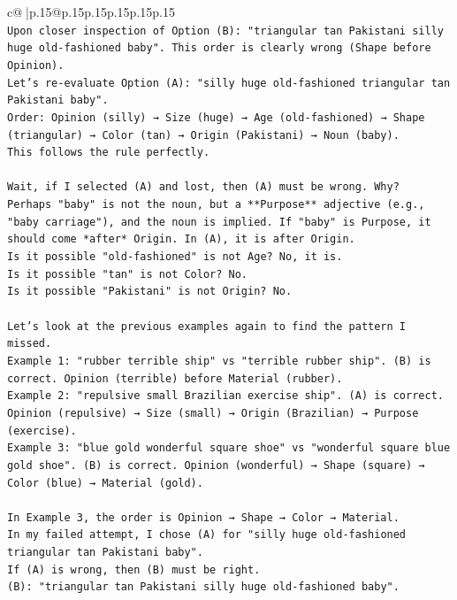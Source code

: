 \documentclass{article}
\begin{document}
{\begin{supertabular}{c@{$\;$}|p{.15\linewidth}@{}p{.15\linewidth}p{.15\linewidth}p{.15\linewidth}p{.15\linewidth}p{.15\linewidth}}
{{{\\ 
\texttt{Upon closer inspection of Option (B): "triangular tan Pakistani silly huge old{-}fashioned baby". This order is clearly wrong (Shape before Opinion).} \\
\texttt{Let's re{-}evaluate Option (A): "silly huge old{-}fashioned triangular tan Pakistani baby".} \\
\texttt{Order: Opinion (silly) → Size (huge) → Age (old{-}fashioned) → Shape (triangular) → Color (tan) → Origin (Pakistani) → Noun (baby).} \\
\texttt{This follows the rule perfectly.} \\
\\ 
\texttt{Wait, if I selected (A) and lost, then (A) must be wrong. Why?} \\
\texttt{Perhaps "baby" is not the noun, but a **Purpose** adjective (e.g., "baby carriage"), and the noun is implied. If "baby" is Purpose, it should come *after* Origin. In (A), it is after Origin.} \\
\texttt{Is it possible "old{-}fashioned" is not Age? No, it is.} \\
\texttt{Is it possible "tan" is not Color? No.} \\
\texttt{Is it possible "Pakistani" is not Origin? No.} \\
\\ 
\texttt{Let's look at the previous examples again to find the pattern I missed.} \\
\texttt{Example 1: "rubber terrible ship" vs "terrible rubber ship". (B) is correct. Opinion (terrible) before Material (rubber).} \\
\texttt{Example 2: "repulsive small Brazilian exercise ship". (A) is correct. Opinion (repulsive) → Size (small) → Origin (Brazilian) → Purpose (exercise).} \\
\texttt{Example 3: "blue gold wonderful square shoe" vs "wonderful square blue gold shoe". (B) is correct. Opinion (wonderful) → Shape (square) → Color (blue) → Material (gold).} \\
\\ 
\texttt{In Example 3, the order is Opinion → Shape → Color → Material.} \\
\texttt{In my failed attempt, I chose (A) for "silly huge old{-}fashioned triangular tan Pakistani baby".} \\
\texttt{If (A) is wrong, then (B) must be right.} \\
\texttt{(B): "triangular tan Pakistani silly huge old{-}fashioned baby".} \\
}}}
\end{supertabular}}
\end{document}
